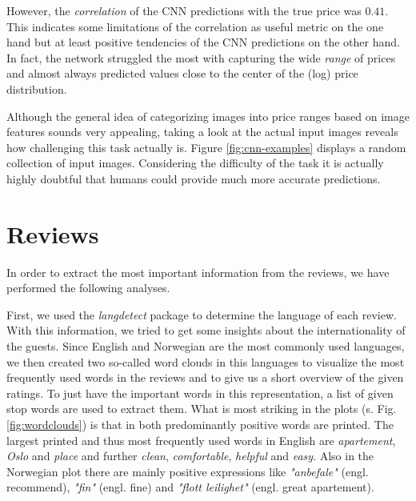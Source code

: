 \documentclass[12pt, letterpaper]{article}
\begin{document}
However, the \emph{correlation} of the CNN predictions with the true price was $0.41$.
This indicates some limitations of the correlation as useful metric on the one hand but at least positive tendencies of the CNN predictions on the other hand.
In fact, the network struggled the most with capturing the wide \emph{range} of prices and almost always predicted values close to the center of the (log) price distribution.

Although the general idea of categorizing images into price ranges based on image features sounds very appealing, taking a look at the actual input images reveals how challenging this task actually is.
Figure \ref{fig:cnn-examples} displays a random collection of input images.
Considering the difficulty of the task it is actually highly doubtful that humans could provide much more accurate predictions.

\section{Reviews}

In order to extract the most important information from the reviews, we have performed the following analyses.

First, we used the \textit{langdetect} package to determine the language of each review. 
With this information, we tried to get some insights about the internationality of the guests. 
Since English and Norwegian are the most commonly used languages, we then created two so-called word clouds in this languages 
to visualize the most frequently used words in the reviews and to give us a short overview of the given ratings.
To just have the important words in this representation, a list of given stop words are used to extract them. 
What is most striking in the plots (s. Fig. \ref{fig:wordclouds}) is that in both predominantly positive words are printed. The largest printed and thus most frequently used words in English are \textit{apartement}, \textit{Oslo} and \textit{place} and 
further \textit{clean}, \textit{comfortable}, \textit{helpful} and \textit{easy}. Also in the Norwegian plot there are mainly positive expressions like \textit{"anbefale"} (engl. recommend), \textit{"fin"} (engl. fine) and \textit{"flott leilighet"} (engl. great apartement).
\end{document}
